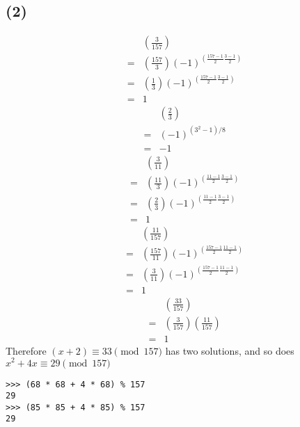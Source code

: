 \documentclass{article}
\begin{document}
\subsection*{(2)}
\begin{eqnarray*}
  & &  \left(\frac{3}{157}\right) \\
  &=& \left(\frac{157}{3}\right) (-1)^{(\frac{157-1}{2}\frac{3-1}{2})} \\
  &=& \left(\frac{1}{3}\right) (-1)^{(\frac{157-1}{2}\frac{3-1}{2})} \\
  &=& 1
\end{eqnarray*}
\begin{eqnarray*}
  & & \left(\frac{2}{3}\right) \\
  &=& (-1)^{(3^2 - 1)/8} \\
  &=& -1
\end{eqnarray*}
\begin{eqnarray*}
  & &  \left(\frac{3}{11}\right) \\
  &=& \left(\frac{11}{3}\right) (-1)^{(\frac{11-1}{2}\frac{3-1}{2})} \\
  &=& \left(\frac{2}{3}\right) (-1)^{(\frac{11-1}{2}\frac{3-1}{2})} \\
  &=& 1
\end{eqnarray*}
\begin{eqnarray*}
  & &  \left(\frac{11}{157}\right) \\
  &=& \left(\frac{157}{11}\right) (-1)^{(\frac{157-1}{2}\frac{11-1}{2})} \\
  &=& \left(\frac{3}{11}\right) (-1)^{(\frac{157-1}{2}\frac{11-1}{2})} \\
  &=& 1
\end{eqnarray*}
\begin{eqnarray*}
  & & \left(\frac{33}{157}\right) \\
  &=& \left(\frac{3}{157}\right)\left(\frac{11}{157}\right) \\
  &=& 1
\end{eqnarray*}
Therefore $ (x + 2) \equiv 33 \pmod{157} $ has two solutions, and so does $ x^2 + 4x \equiv 29 \pmod{157} $
\begin{verbatim}
>>> (68 * 68 + 4 * 68) % 157
29
>>> (85 * 85 + 4 * 85) % 157
29
\end{verbatim}
\end{document}
